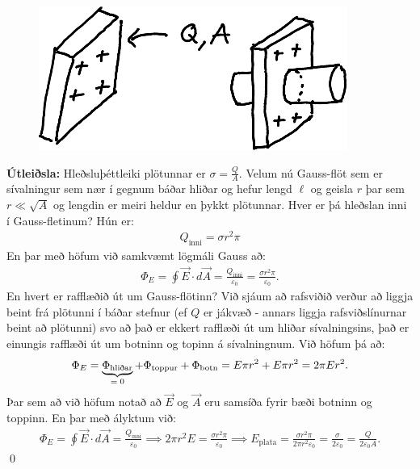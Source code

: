 \begin{minipage}{\linewidth}

\begin{figure}
\vspace{0.4cm}
\centering
\includegraphics{figures/sivaln-hdrawn.pdf}
\end{figure}

\textbf{Útleiðsla:} Hleðsluþéttleiki plötunnar er $\sigma = \frac{Q}{A}$. Velum nú Gauss-flöt sem er sívalningur sem nær í gegnum báðar hliðar og hefur lengd $\ell$ og geisla $r$ þar sem $r \ll \sqrt{A}$ og lengdin er meiri heldur en þykkt plötunnar. Hver er þá hleðslan inni í Gauss-fletinum? Hún er:
\begin{align*}
    Q_{\text{inni}} = \sigma r^2 \pi 
\end{align*}
En þar með höfum við samkvæmt lögmáli Gauss að:
\begin{align*}
    \Phi_E = \oint \vec{E} \cdot d\vec{A} = \frac{Q_{\text{inni}}}{\varepsilon_0} = \frac{\sigma r^2 \pi}{\varepsilon_0}.
\end{align*}
En hvert er rafflæðið út um Gauss-flötinn? Við sjáum að rafsviðið verður að liggja beint frá plötunni í báðar stefnur (ef $Q$ er jákvæð - annars liggja rafsviðslínurnar beint að plötunni) svo að það er ekkert rafflæði út um hliðar sívalningsins, það er einungis rafflæði út um botninn og topinn á sívalningnum. Við höfum þá að:
\begin{align*}
    \Phi_E = \underbrace{\Phi_{\text{hliðar}}}_\textrm{$= 0$} + \Phi_{\text{toppur}} + \Phi_{\text{botn}} = E \pi r^2 + E\pi r^2 = 2\pi Er^2.
\end{align*}
Þar sem að við höfum notað að $\vec{E}$ og $\vec{A}$ eru samsíða fyrir bæði botninn og toppinn. En þar með ályktum við:
\begin{align*}
    \Phi_E = \oint \vec{E} \cdot d\vec{A} = \frac{Q_{\text{inni}}}{\varepsilon_0} \implies 2\pi r^2 E = \frac{\sigma r^2 \pi}{\varepsilon_0} \implies E_{\text{plata}} = \frac{\sigma r^2 \pi}{2\pi r^2 \varepsilon_0} = \frac{\sigma}{2 \varepsilon_0} = \frac{Q}{2\varepsilon_0 A}.
\end{align*}
\qed
\end{minipage}

